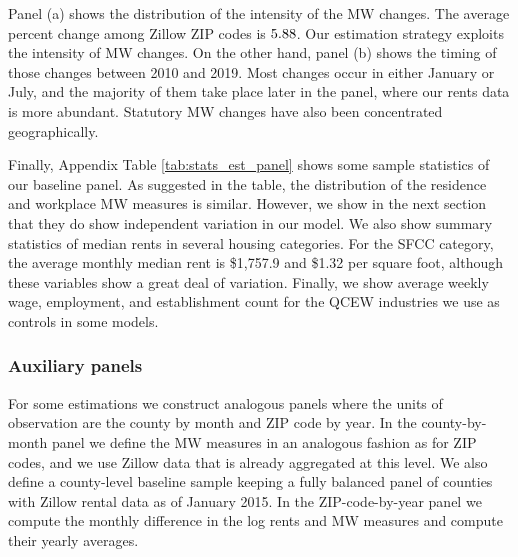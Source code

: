 Panel (a) shows the distribution of the intensity of the MW changes. 
The average percent change among Zillow ZIP codes is $\textnormal{5.88}$.
Our estimation strategy exploits the intensity of MW changes.
On the other hand, panel (b) shows the timing of those changes between 2010 and 
2019.
Most changes occur in either January or July, and the majority of them take 
place later in the panel, where our rents data is more abundant.
Statutory MW changes have also been concentrated geographically.

Finally, Appendix Table \ref{tab:stats_est_panel} shows some sample statistics 
of our baseline panel.
As suggested in the table, the distribution of the residence and workplace MW 
measures is similar.
However, we show in the next section that they do show independent variation
in our model.
We also show summary statistics of median rents in several housing categories.
For the SFCC category, the average monthly median rent is \$1,757.9 and \$1.32 
per square foot, although these variables show a great deal of variation.
Finally, we show average weekly wage, employment, and establishment count 
for the QCEW industries we use as controls in some models.

\subsubsection*{Auxiliary panels}
\label{sec:data_aux_panels}

For some estimations we construct analogous panels where the units of 
observation are the county by month and ZIP code by year.
In the county-by-month panel we define the MW measures in an analogous fashion 
as for ZIP codes, and we use Zillow data that is already aggregated at this 
level.
We also define a county-level baseline sample keeping a fully balanced panel of 
counties with Zillow rental data as of January 2015.
In the ZIP-code-by-year panel we compute the monthly difference in the log rents 
and MW measures and compute their yearly averages.
